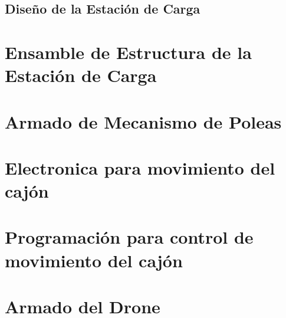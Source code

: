 \subsection{Diseño de la Estación de Carga}

\section{Ensamble de Estructura de la Estación de Carga}

\section{Armado de Mecanismo de Poleas}

\section{Electronica para movimiento del cajón}

\section{Programación para control de movimiento del cajón}

\section{Armado del Drone}








